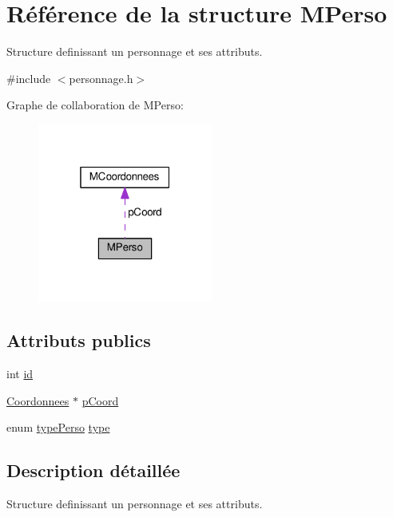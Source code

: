 \hypertarget{structMPerso}{}\section{Référence de la structure M\+Perso}
\label{structMPerso}


Structure definissant un personnage et ses attributs.  




{\ttfamily \#include $<$personnage.\+h$>$}



Graphe de collaboration de M\+Perso\+:\nopagebreak
\begin{figure}[H]
\begin{center}
\leavevmode
\includegraphics[width=163pt]{structMPerso__coll__graph}
\end{center}
\end{figure}
\subsection*{Attributs publics}
\begin{DoxyCompactItemize}
\item 
int \hyperlink{structMPerso_af6a4c47de69856669b2f1810d4c870e7}{id}
\item 
\hyperlink{coordonnees_8h_a79929cdfee7bd985a5e4e25276bb3ba9}{Coordonnees} $\ast$ \hyperlink{structMPerso_afcc7996dea19cc509e8bda2725fa8c3b}{p\+Coord}
\item 
enum \hyperlink{personnage_8h_a3f6a2951aa3d5d428dd6d61e74db0d75}{type\+Perso} \hyperlink{structMPerso_a476ff327af93f97f1ae6408e2ebc1986}{type}
\end{DoxyCompactItemize}


\subsection{Description détaillée}
Structure definissant un personnage et ses attributs. 


